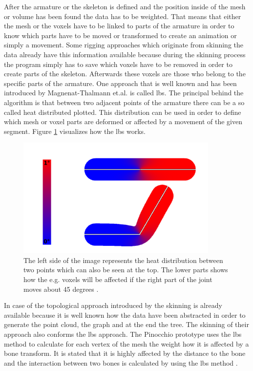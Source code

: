 After the armature or the skeleton is defined and the position inside of the mesh or volume has been found the data has to be weighted. That means that either the mesh or the voxels have to be linked to parts of the armature in order to know which parts have to be moved or transformed to create an animation or simply a movement. Some rigging approaches which originate from skinning the data already have this information available because during the skinning process the program simply has to save which voxels have to be removed in order to create parts of the skeleton. Afterwards these voxels are those who belong to the specific parts of the armature. One approach that is well known and has been introduced by Magnenat-Thalmann et.al. is called \gls{lbs}. The principal behind the algorithm is that between two adjacent points of the armature there can be a so called heat distributed plotted. This distribution can be used in order to define which mesh or voxel parts are deformed or affected by a movement of the given segment. Figure \ref{fig:lbs} visualizes how the \gls{lbs} works.

\begin{figure} [htb!]
    \centering
	\includegraphics[width=10cm]{content/images/lbs}
	\caption{The left side of the image represents the heat distribution between two points which can also be seen at the top. The lower parts shows how the e.g. voxels will be affected if the right part of the joint moves about 45 degrees \cite{Baran2007}.} 
	\label{fig:lbs}
\end{figure}

\newpage

In case of the topological approach introduced by \cite{Bharaj2012} the skinning is already available because it is well known how the data have been abstracted in order to generate the point cloud, the graph and at the end the tree. The skinning of their approach also conforms the \gls{lbs} approach. The Pinocchio prototype uses the \gls{lbs} method to calculate for each vertex of the mesh the weight how it is affected by a bone transform. It is stated that it is highly affected by the distance to the bone and the interaction between two bones is calculated by using the \gls{lbs} method \cite{Baran2007}.

